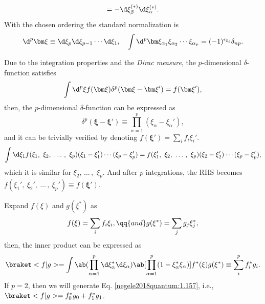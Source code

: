 \begin{solution}
\begin{enumext}
\[    = -\d\xi_\beta^{(*)} \d\xi_\alpha^{(*)}.
    \]
    With the chosen ordering the standard normalization is
    \[
      \d^p\bm\xi \equiv \d\xi_p \d\xi_{p-1} \cdots \d\xi_1, \quad
      \int \d^p\bm\xi_{\alpha_1} \xi_{\alpha_2} \cdots \xi_{\alpha_p}
    = (-1)^{\epsilon_{\xi_i}} \delta_{np}.
    \]
    \item Due to the integration properties and the \emph{Dirac measure}, the
    $p$-dimensional $\delta$-function satisfies
    \[
      \int \d^p\xi f(\bm\xi) \delta^p(\bm\xi - \bm\xi') = f(\bm\xi'),
    \]
    then, the $p$-dimensional $\delta$-function can be expressed as
    \[
      \delta^p(\bm\xi - \bm\xi') \equiv \prod_{\alpha=1}^p
      (\xi_\alpha - \xi_\alpha'),
    \]
    and it can be trivially verified by denoting
    $f(\bm\xi') = \sum_i f_i\xi_i'$.
    \[
      \int \d\xi_1 f(\xi_1,\ \xi_2,\ \ldots\,,~\xi_p)
        (\xi_1 - \xi_1') \cdots (\xi_p - \xi_p')
    = f(\xi_1',\ \xi_2,\ \ldots\,,~\xi_p)
        (\xi_2 - \xi_2') \cdots (\xi_p - \xi_p'),
    \]
    which it is similar for $\xi_2$, $\ldots\,$,~$\xi_p$.
    And after $p$ integrations, the RHS becomes
    $f(\xi_1',\ \xi_2',\ \ldots\,,~\xi_p') \equiv f(\bm\xi')$.
    \item Expand $f(\xi)$ and $g(\xi^*)$ as
    \[
      f(\xi) = \sum_i f_i\xi_i, \qq{and}
      g(\xi^*) = \sum_j g_j\xi_j^*,
    \]
    then, the inner product can be expressed as
    \[
      \braket<f|g> = \int \ab(\prod_{\alpha=1}^p \d\xi_\alpha^* \d\xi_\alpha)
      \ab[\prod_{\alpha=1}^p (1 - \xi_\alpha^*\xi_\alpha)] f^*(\xi) g(\xi^*)
      \equiv \sum_i^p f_i^* g_i.
    \]
    If $p = 2$, then we will generate Eq. \eqref{negele2018quantum:1.157}, i.e.,
    $\braket<f|g> = f_0^* g_0 + f_1^* g_1$.
  \end{enumext}
\end{solution}
\newpage
